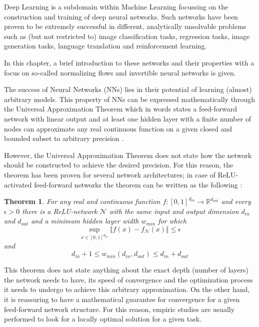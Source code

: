 \label{ch:deeplearning}

Deep Learning is a subdomain within Machine Learning focussing on the construction and training of deep neural networks. Such networks have been proven to be extremely successful in different, analytically unsolvable problems such as (but not restricted to) image classification tasks, regression tasks, image generation tasks, language translation and reinforcement learning.

In this chapter, a brief introduction to these networks and their properties with a focus on so-called normalizing flows and invertible neural networks is given.


The success of Neural Networks (NNs) lies in their potential of learning (almost) arbitrary models. This property of NNs can be expressed mathematically through the Universal Approximation Theorem which in words states a feed-forward network with linear output and at least one hidden layer with a finite number of nodes can approximate any real continuous function on a given closed and bounded subset to arbitrary precision \cite{DLiPR}.

However, the Universal Approximation Theorem does not state how the network should be constructed to achieve the desired precision. For this reason, the theorem has been proven for several network architectures; in case of ReLU-activated feed-forward networks the theorem can be written as the following \cite{UAC}:
\newtheorem{theorem}{Theorem}
\begin{theorem}
	For any real and continuous function $f : [0, 1]^{d_{in}} \rightarrow \mathbb{R}^{d_{out}}$ and every $\epsilon>0$ there is a ReLU-network $\mathcal{N}$ with the same input and output dimension $d_{in}$ and $d_{out}$ and a minimum hidden layer width $w_{min}$ for which
	\begin{equation*}
		\sup_{x\in[0, 1]^{d_{in}}}\Vert f(x)-f_\mathcal{N}(x)\Vert \leq \epsilon
	\end{equation*}
	and
	\begin{equation*}
		d_{in} + 1 \leq w_{min}(d_{in}, d_{out}) \leq d_{in} + d_{out}
	\end{equation*}
\end{theorem}
This theorem does not state anything about the exact depth (number of layers) the network needs to have, its speed of convergence and the optimization process it needs to undergo to achieve this arbitrary approximation. On the other hand, it is reassuring to have a mathematical guarantee for convergence for a given feed-forward network structure. For this reason, empiric studies are usually performed to look for a locally optimal solution for a given task.

